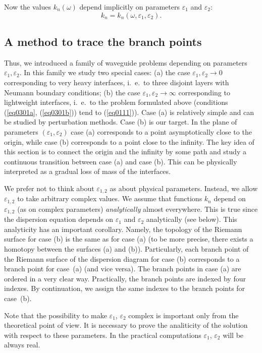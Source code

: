 \documentclass[12pt]{article}
\newcommand{\eps}{\varepsilon}
\begin{document}
Now the values $k_n(\omega)$ depend implicitly on parameters $\eps_1$ and $\eps_2$:
\[
k_n = k_n(\omega , \eps_1 , \eps_2).
\] 


\subsection{A method to trace the branch points}

Thus, we introduced a family of waveguide problems depending on parameters $\eps_1, \eps_2$. 
In this family we study two special cases: 
(a) the case $\eps_1 , \eps_2 \to 0$ corresponding to 
very heavy interfaces, i.~e.\ to
three disjoint layers with Neumann 
boundary conditions; 
(b) the case $\eps_1 , \eps_2 \to \infty$ corresponding
to lightweight interfaces, i.~e.\ 
to the problem formulated above (conditions (\ref{eq0301a}, (\ref{eq0301b})) tend to (\ref{eq0111})). 
Case (a) is relatively simple and can be studied by perturbation methods. Case (b) 
is our target. In the plane of parameters $(\eps_1 , \eps_2)$ case (a) corresponds to a point asymptotically close to the origin, while case (b) corresponds to a point close to the infinity. 
The key idea of this section is to connect the origin and the infinity by some path 
and study a continuous transition between case (a) and case (b). This 
can be physically interpreted as 
a gradual loss of mass of the interfaces. 

We prefer not to think about $\eps_{1,2}$ as about physical parameters. 
Instead, we allow $\eps_{1,2}$ to take arbitrary complex values. 
We assume that functions $k_n$ depend on $\eps_{1,2}$ (as on complex parameters)
{\em analytically\/} almost everywhere. This is true since the dispersion equation depends 
on $\eps_1$ and $\eps_2$ analytically (see below). This analyticity has an important corollary. Namely, the topology of the Riemann surface for case (b) 
is the same as for case (a) (to be more precise, there exists a homotopy between the surfaces (a) and (b)). Particularly, each branch point of the Riemann surface of the dispersion diagram for 
case (b) corresponds to a branch point for case~(a)
(and vice versa). The branch points in case (a) are ordered in a 
very clear way. 
Practically, the branch points 
are indexed by four indexes.
By continuation, we assign the same indexes to the branch points for case~(b). 

Note that the possibility to make $\eps_1$, $\eps_2$ complex is important only from the 
theoretical point of view. It is necessary to prove the analiticity of the solution 
with respect to these parameters. In the practical computations $\eps_1$, $\eps_2$
will be always real. 
\end{document}
